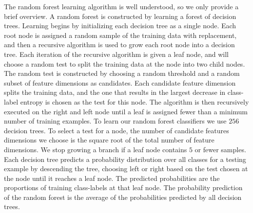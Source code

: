     The random forest learning algorithm is well understood, so we only provide a brief overview.
    A random forest is constructed by learning a forest of decision trees.
    Learning begins by initializing each decision tree as a single node.
    Each root node is assigned a random sample of the training data with replacement, and then a recursive
      algorithm is used to grow each root node into a decision tree.
    Each iteration of the recursive algorithm is given a leaf node, and will choose a random test to split the
      training data at the node into two child nodes.
    The random test is constructed by choosing a random threshold and a random subset of feature dimensions as
      candidates.
    Each candidate feature dimension splits the training data, and the one that results in the largest decrease
      in class-label entropy is chosen as the test for this node.
    The algorithm is then recursively executed on the right and left node until a leaf is assigned fewer than a
      minimum number of training examples.
    To learn our random forest classifiers we use $256$ decision trees.
    To select a test for a node, the number of candidate features dimensions we choose is the square root of the
      total number of feature dimensions.
    We stop growing a branch if a leaf node contains $5$ or fewer samples.
    Each decision tree predicts a probability distribution over all classes for a testing example by descending
      the tree, choosing left or right based on the test chosen at the node until it reaches a leaf node.
    The predicted probabilities are the proportions of training class-labels at that leaf node.
    The probability prediction of the random forest is the average of the probabilities predicted by all decision
      trees.

